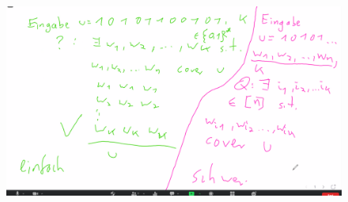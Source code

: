 \begin{figure}[h]
	\includegraphics[width=\linewidth]{proof-sketches/Screenshot[2]-01.png}
\end{figure}

